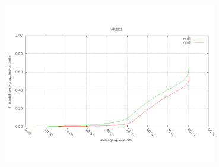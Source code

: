 \documentclass[a4paper]{article}
\begin{document}
  \begin{center}
	\includegraphics[width=0.70\textwidth]{wred2.png}
	\label{fig:test-wred2}
  \end{center}
\end{document}
